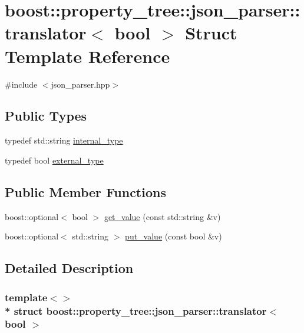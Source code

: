 \hypertarget{structboost_1_1property__tree_1_1json__parser_1_1translator_3_01bool_01_4}{}\section{boost\+:\+:property\+\_\+tree\+:\+:json\+\_\+parser\+:\+:translator$<$ bool $>$ Struct Template Reference}
\label{structboost_1_1property__tree_1_1json__parser_1_1translator_3_01bool_01_4}


{\ttfamily \#include $<$json\+\_\+parser.\+hpp$>$}

\subsection*{Public Types}
\begin{DoxyCompactItemize}
\item 
typedef std\+::string \hyperlink{structboost_1_1property__tree_1_1json__parser_1_1translator_3_01bool_01_4_afb06d7dd56a70ab4a34df47427f9498d}{internal\+\_\+type}
\item 
typedef bool \hyperlink{structboost_1_1property__tree_1_1json__parser_1_1translator_3_01bool_01_4_a735dcf537d03fd03712c193e56de30bc}{external\+\_\+type}
\end{DoxyCompactItemize}
\subsection*{Public Member Functions}
\begin{DoxyCompactItemize}
\item 
boost\+::optional$<$ bool $>$ \hyperlink{structboost_1_1property__tree_1_1json__parser_1_1translator_3_01bool_01_4_a8e1c4f5fe17ec4a1a4bfd9acadc99403}{get\+\_\+value} (const std\+::string \&v)
\item 
boost\+::optional$<$ std\+::string $>$ \hyperlink{structboost_1_1property__tree_1_1json__parser_1_1translator_3_01bool_01_4_afb6097b473b4da99966191d43317ad64}{put\+\_\+value} (const bool \&v)
\end{DoxyCompactItemize}


\subsection{Detailed Description}
\subsubsection*{template$<$$>$\\*
struct boost\+::property\+\_\+tree\+::json\+\_\+parser\+::translator$<$ bool $>$}



